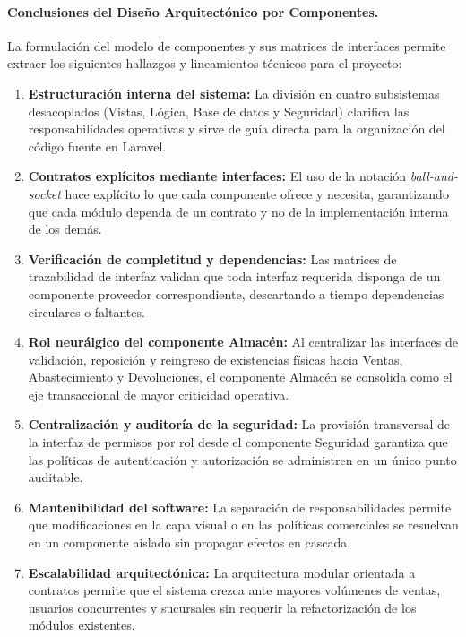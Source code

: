 \documentclass[12pt,a4paper]{article}
\begin{document}
\paragraph{Conclusiones del Diseño Arquitectónico por Componentes.}
La formulación del modelo de componentes y sus matrices de interfaces permite extraer los siguientes hallazgos y lineamientos técnicos para el proyecto:
\begin{enumerate}
    \item \textbf{Estructuración interna del sistema:} La división en cuatro subsistemas desacoplados (Vistas, Lógica, Base de datos y Seguridad) clarifica las responsabilidades operativas y sirve de guía directa para la organización del código fuente en Laravel.
    \item \textbf{Contratos explícitos mediante interfaces:} El uso de la notación \emph{ball-and-socket} hace explícito lo que cada componente ofrece y necesita, garantizando que cada módulo dependa de un contrato y no de la implementación interna de los demás.
    \item \textbf{Verificación de completitud y dependencias:} Las matrices de trazabilidad de interfaz validan que toda interfaz requerida disponga de un componente proveedor correspondiente, descartando a tiempo dependencias circulares o faltantes.
    \item \textbf{Rol neurálgico del componente Almacén:} Al centralizar las interfaces de validación, reposición y reingreso de existencias físicas hacia Ventas, Abastecimiento y Devoluciones, el componente Almacén se consolida como el eje transaccional de mayor criticidad operativa.
    \item \textbf{Centralización y auditoría de la seguridad:} La provisión transversal de la interfaz de permisos por rol desde el componente Seguridad garantiza que las políticas de autenticación y autorización se administren en un único punto auditable.
    \item \textbf{Mantenibilidad del software:} La separación de responsabilidades permite que modificaciones en la capa visual o en las políticas comerciales se resuelvan en un componente aislado sin propagar efectos en cascada.
    \item \textbf{Escalabilidad arquitectónica:} La arquitectura modular orientada a contratos permite que el sistema crezca ante mayores volúmenes de ventas, usuarios concurrentes y sucursales sin requerir la refactorización de los módulos existentes.
\end{enumerate}
\end{document}
